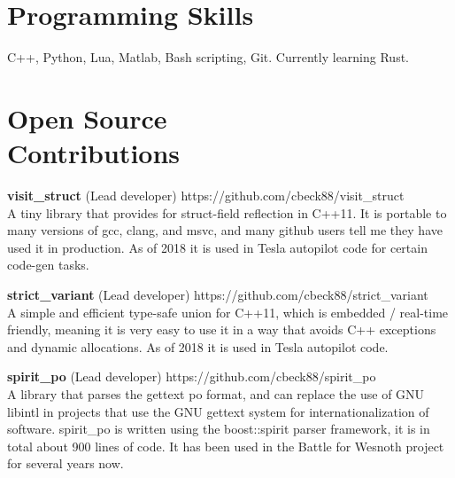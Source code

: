 \documentclass[margin,line]{resume}
\begin{document}
\begin{resume}

       


    \section{\mysidestyle Programming Skills} 

    C++, Python, Lua, Matlab, Bash scripting, Git. Currently learning Rust.

    \section{\mysidestyle Open Source\\Contributions}

    \textbf{visit\_struct} (Lead developer) \hfill https://github.com/cbeck88/visit\_struct \\
    A tiny library that provides for struct-field reflection in C++11. It is portable to many versions of gcc, clang, and msvc,
    and many github users tell me they have used it in production. As of 2018 it is used in Tesla autopilot code for certain code-gen tasks.

    \textbf{strict\_variant} (Lead developer) \hfill https://github.com/cbeck88/strict\_variant \\
    A simple and efficient type-safe union for C++11, which is embedded / real-time friendly, meaning it is very easy
    to use it in a way that avoids C++ exceptions and dynamic allocations. As of 2018 it is used in Tesla autopilot code.

    \textbf{spirit\_po} (Lead developer) \hfill https://github.com/cbeck88/spirit\_po \\
    A library that parses the gettext po format, and can replace the use of GNU libintl in projects that use the GNU
    gettext system for internationalization of software.
    spirit\_po is written using the boost::spirit parser framework, it is in total about 900 lines of code.
    It has been used in the Battle for Wesnoth project for several years now.


\end{resume}
\end{document}
